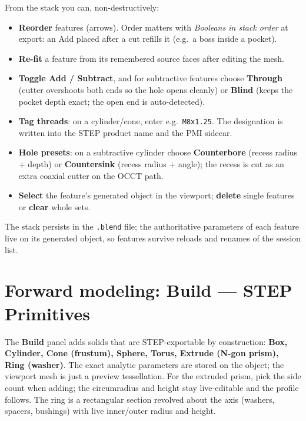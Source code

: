 \documentclass[11pt,a4paper]{article}
\newcommand{\ui}[1]{\textsf{\textbf{#1}}}   %
\begin{document}
From the stack you can, non-destructively:

\begin{itemize}[nosep]
  \item \textbf{Reorder} features (arrows). Order matters with
    \emph{Booleans in stack order} at export: an Add placed after a cut
    refills it (e.g.\ a boss inside a pocket).
  \item \textbf{Re-fit} a feature from its remembered source faces after
    editing the mesh.
  \item \textbf{Toggle Add / Subtract}, and for subtractive features choose
    \ui{Through} (cutter overshoots both ends so the hole opens cleanly) or
    \ui{Blind} (keeps the pocket depth exact; the open end is auto-detected).
  \item \textbf{Tag threads}: on a cylinder/cone, enter e.g.\ \texttt{M8x1.25}.
    The designation is written into the STEP product name and the PMI sidecar.
  \item \textbf{Hole presets}: on a subtractive cylinder choose
    \ui{Counterbore} (recess radius + depth) or \ui{Countersink} (recess
    radius + angle); the recess is cut as an extra coaxial cutter on the OCCT
    path.
  \item \textbf{Select} the feature's generated object in the viewport;
    \textbf{delete} single features or \textbf{clear} whole sets.
\end{itemize}

The stack persists in the \texttt{.blend} file; the authoritative parameters
of each feature live on its generated object, so features survive reloads and
renames of the session list.

\section{Forward modeling: Build --- STEP Primitives}
\label{sec:forward}

The \ui{Build} panel adds solids that are STEP-exportable by construction:
\textbf{Box, Cylinder, Cone (frustum), Sphere, Torus, Extrude (N-gon prism),
Ring (washer)}. The exact analytic parameters are stored on the object; the
viewport mesh is just a preview tessellation. For the extruded prism, pick
the side count when adding; the circumradius and height stay live-editable
and the profile follows. The ring is a rectangular section revolved about
the axis (washers, spacers, bushings) with live inner/outer radius and
height.
\end{document}
